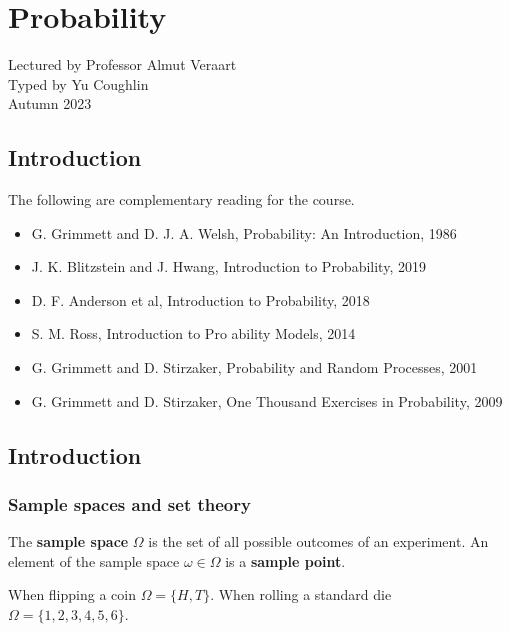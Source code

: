 \documentclass[../Year1.tex]{subfiles}
\begin{document}
\chapter{Probability}
\renewcommand*\thesection{\arabic{section}}
Lectured by Professor Almut Veraart \\ Typed by Yu Coughlin \\
Autumn 2023

\section*{Introduction}

The following are complementary reading for the course.
\begin{itemize}
    \item G. Grimmett and D. J. A. Welsh, Probability: An Introduction, 1986
    \item J. K. Blitzstein and J. Hwang, Introduction to Probability, 2019
    \item D. F. Anderson et al, Introduction to Probability, 2018
    \item S. M. Ross, Introduction to Pro ability Models, 2014
    \item G. Grimmett and D. Stirzaker, Probability and Random Processes, 2001
    \item G. Grimmett and D. Stirzaker, One Thousand Exercises in Probability, 2009
\end{itemize}

\tableofcontents\pagebreak


\section{Introduction}

\subsection{Sample spaces and set theory}

\begin{definition}
    The \textbf{sample space} $\Omega$ is the set of all possible outcomes of an experiment. An element of the sample space $\omega \in \Omega$ is a \textbf{sample point}.
\end{definition}

\begin{examples}
    When flipping a coin $\Omega  = \{H,T\}$. When rolling a standard die $\Omega = \{1,2,3,4,5,6\}$.
\end{examples}
\end{document}
